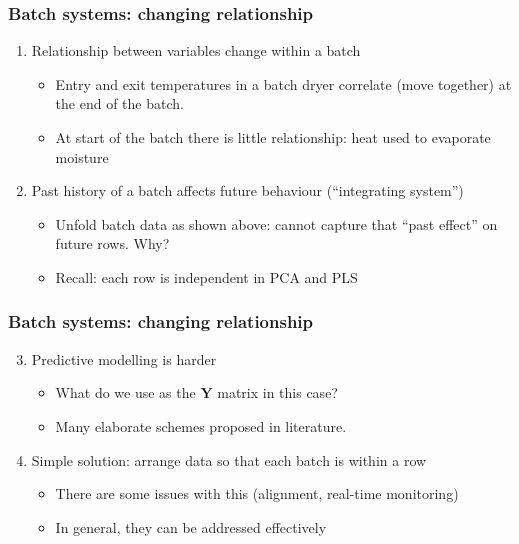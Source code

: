 \documentclass[handout, 12pt]{beamer}
\begin{document}
\begin{frame}\frametitle{Batch systems: changing relationship}

\begin{enumerate}
	\item Relationship between variables change within a batch 
			\begin{itemize}
				\item 	Entry and exit temperatures in a batch dryer correlate (move together) at the end of the batch. 
				\item 	At start of the batch there is little relationship: heat used to evaporate moisture	
			\end{itemize}\pause

	
	\item Past history of a batch affects future behaviour (``integrating system'')
	
			\begin{itemize}
				\item 	Unfold batch data as shown above: cannot capture that ``past effect'' on future rows.  Why?
				\item  	Recall: each row is independent in PCA and PLS
			\end{itemize}

\end{enumerate}
\end{frame}

\begin{frame}\frametitle{Batch systems: changing relationship}

\begin{enumerate}
	\setcounter{enumi}{2}
	\item 	Predictive modelling is harder

		
		\begin{itemize}
			\item 	What do we use as the \( \mathbf{Y} \) matrix in this case?
			\item 	Many elaborate schemes proposed in literature.			
		\end{itemize}
		
	\item 	Simple solution: arrange data so that each batch is within a row
	
			\begin{itemize}
				\item 	There are some issues with this  (alignment, real-time monitoring)
				\item 	In general, they can be addressed effectively
			\end{itemize}
\end{enumerate}
\end{frame}
\end{document}
